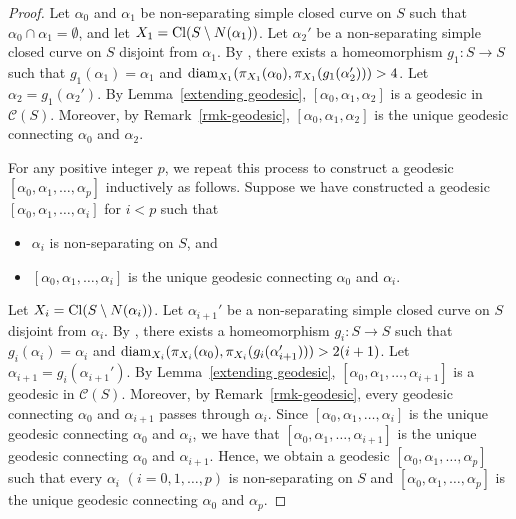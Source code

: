 \documentclass[]{aspm}
\begin{document}
\begin{proof}
Let $\alpha_0$ and $\alpha_1$ be non-separating simple closed curve on $S$ such that $\alpha_0\cap\alpha_1=\emptyset$, and let $X_1={\rm Cl}(S\setminus N(\alpha_1))$.
Let $\alpha_2'$ be a non-separating simple closed curve on $S$ disjoint from $\alpha_1$. 
By \cite[Proposition 4.6]{MM1}, there exists a homeomorphism $g_1:S\rightarrow S$ such that $g_1(\alpha_1)=\alpha_1$ and ${\rm diam}_{X_1}(\pi_{X_1}(\alpha_0), \pi_{X_1}(g_1(\alpha_2')))>4$. 
Let $\alpha_2=g_1(\alpha_2')$. 
By Lemma~\ref{extending geodesic}, $[\alpha_0,\alpha_1,\alpha_2]$ is a geodesic in $\mathcal{C}(S)$.
Moreover, by Remark~\ref{rmk-geodesic}, $[\alpha_0,\alpha_1,\alpha_2]$ is the unique geodesic connecting $\alpha_0$ and $\alpha_2$.

For any positive integer $p$, we repeat this process to construct a geodesic $[\alpha_0,\alpha_1,\dots, \alpha_p]$ inductively as follows.
Suppose we have constructed a geodesic $[\alpha_0,\alpha_1,\dots, \alpha_i]$ for $i<p$ such that 
\begin{itemize}
\item $\alpha_i$ is non-separating on $S$, and
\item $[\alpha_0,\alpha_1,\dots, \alpha_i]$ is the unique geodesic connecting $\alpha_0$ and $\alpha_i$.
\end{itemize}
Let $X_i={\rm Cl}(S\setminus N(\alpha_i))$.
Let $\alpha_{i+1}'$ be a non-separating simple closed curve on $S$ disjoint from $\alpha_i$. 
By \cite[Proposition 4.6]{MM1}, there exists a homeomorphism $g_i:S\rightarrow S$ such that $g_i(\alpha_i)=\alpha_i$ and ${\rm diam}_{X_i}(\pi_{X_i}(\alpha_0), \pi_{X_i}(g_i(\alpha_{i+1}')))>2(i+1)$. 
Let $\alpha_{i+1}=g_i(\alpha_{i+1}')$. 
By Lemma~\ref{extending geodesic}, $[\alpha_0,\alpha_1,\dots, \alpha_{i+1}]$ is a geodesic in $\mathcal{C}(S)$.
Moreover, by Remark~\ref{rmk-geodesic}, every geodesic connecting $\alpha_0$ and $\alpha_{i+1}$ passes through $\alpha_i$.
Since $[\alpha_0,\alpha_1,\dots, \alpha_i]$ is the unique geodesic connecting $\alpha_0$ and $\alpha_i$, we have that $[\alpha_0,\alpha_1,\dots, \alpha_{i+1}]$ is the unique geodesic connecting $\alpha_0$ and $\alpha_{i+1}$.
Hence, we obtain a geodesic $[\alpha_0,\alpha_1,\dots, \alpha_p]$ such that every $\alpha_i$ $(i=0,1,\dots,p)$ is non-separating on $S$ and $[\alpha_0,\alpha_1,\dots, \alpha_p]$ is the unique geodesic connecting $\alpha_0$ and $\alpha_p$.
\end{proof}
\end{document}
